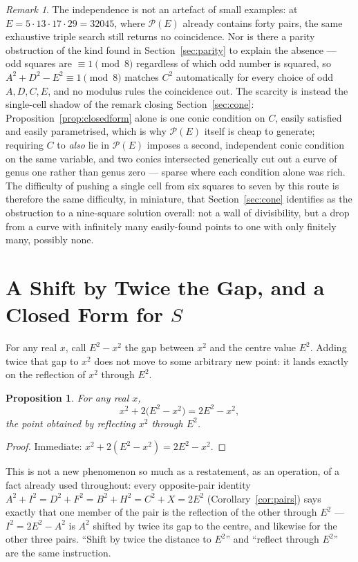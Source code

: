 \documentclass[12pt]{article}
\newtheorem{proposition}[theorem]{Proposition}
\theoremstyle{remark}
\newtheorem{remark}[theorem]{Remark}
\begin{document}
\begin{remark}
The independence is not an artefact of small examples: at
$E=5\cdot13\cdot17\cdot29=32045$, where $\mathcal P(E)$ already
contains forty pairs, the same exhaustive triple search still returns
no coincidence. Nor is there a parity obstruction of the kind found in
Section~\ref{sec:parity} to explain the absence --- odd squares are
$\equiv1\pmod8$ regardless of which odd number is squared, so
$A^2+D^2-E^2\equiv1\pmod8$ matches $C^2$ automatically for every choice
of odd $A,D,C,E$, and no modulus rules the coincidence out. The
scarcity is instead the single-cell shadow of the remark closing
Section~\ref{sec:cone}: Proposition~\ref{prop:closedform} alone is one
conic condition on $C$, easily satisfied and easily parametrised, which
is why $\mathcal P(E)$ itself is cheap to generate; requiring $C$ to
\emph{also} lie in $\mathcal P(E)$ imposes a second, independent conic
condition on the same variable, and two conics intersected generically
cut out a curve of genus one rather than genus zero --- sparse where
each condition alone was rich. The difficulty of pushing a single cell
from six squares to seven by this route is therefore the same
difficulty, in miniature, that Section~\ref{sec:cone} identifies as the
obstruction to a nine-square solution overall: not a wall of
divisibility, but a drop from a curve with infinitely many
easily-found points to one with only finitely many, possibly none.
\end{remark}

\section{A Shift by Twice the Gap, and a Closed Form for $S$}\label{sec:reflectionshift}

For any real $x$, call $E^2-x^2$ the gap between $x^2$ and the centre
value $E^2$. Adding twice that gap to $x^2$ does not move to some
arbitrary new point: it lands exactly on the reflection of $x^2$
through $E^2$.

\begin{proposition}\label{prop:reflectionshift}
For any real $x$,
\[
x^2 + 2\bigl(E^2-x^2\bigr) = 2E^2-x^2 ,
\]
the point obtained by reflecting $x^2$ through $E^2$.
\end{proposition}

\begin{proof}
Immediate: $x^2+2(E^2-x^2)=2E^2-x^2$.
\end{proof}

This is not a new phenomenon so much as a restatement, as an
operation, of a fact already used throughout: every opposite-pair
identity $A^2+I^2=D^2+F^2=B^2+H^2=C^2+X=2E^2$
(Corollary~\ref{cor:pairs}) says exactly that one member of the pair
is the reflection of the other through $E^2$ --- $I^2=2E^2-A^2$ is
$A^2$ shifted by twice its gap to the centre, and likewise for the
other three pairs. ``Shift by twice the distance to $E^2$'' and
``reflect through $E^2$'' are the same instruction.
\end{document}
